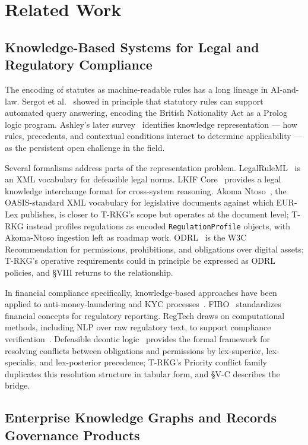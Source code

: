 \documentclass{ieeeaccess}
\begin{document}
\section{Related Work}

\subsection{Knowledge-Based Systems for Legal and Regulatory Compliance}

The encoding of statutes as machine-readable rules has a long lineage in AI-and-law. Sergot et al.~\cite{sergot1986} showed in principle that statutory rules can support automated query answering, encoding the British Nationality Act as a Prolog logic program. Ashley's later survey~\cite{ashley2017} identifies knowledge representation — how rules, precedents, and contextual conditions interact to determine applicability — as the persistent open challenge in the field.

Several formalisms address parts of the representation problem. LegalRuleML~\cite{legalruleml} is an XML vocabulary for defeasible legal norms. LKIF Core~\cite{lkif} provides a legal knowledge interchange format for cross-system reasoning. Akoma Ntoso~\cite{akomantoso}, the OASIS-standard XML vocabulary for legislative documents against which EUR-Lex publishes, is closer to T-RKG's scope but operates at the document level; T-RKG instead profiles regulations as encoded \texttt{RegulationProfile} objects, with Akoma-Ntoso ingestion left as roadmap work. ODRL~\cite{odrl} is the W3C Recommendation for permissions, prohibitions, and obligations over digital assets; T-RKG's operative requirements could in principle be expressed as ODRL policies, and §VIII returns to the relationship.

In financial compliance specifically, knowledge-based approaches have been applied to anti-money-laundering and KYC processes~\cite{weber2019}. FIBO~\cite{fibo} standardizes financial concepts for regulatory reporting. RegTech draws on computational methods, including NLP over raw regulatory text, to support compliance verification~\cite{arner2017,legalbert}. Defeasible deontic logic~\cite{governatori2013} provides the formal framework for resolving conflicts between obligations and permissions by lex-superior, lex-specialis, and lex-posterior precedence; T-RKG's Priority conflict family duplicates this resolution structure in tabular form, and §V-C describes the bridge.

\subsection{Enterprise Knowledge Graphs and Records Governance Products}
\end{document}
